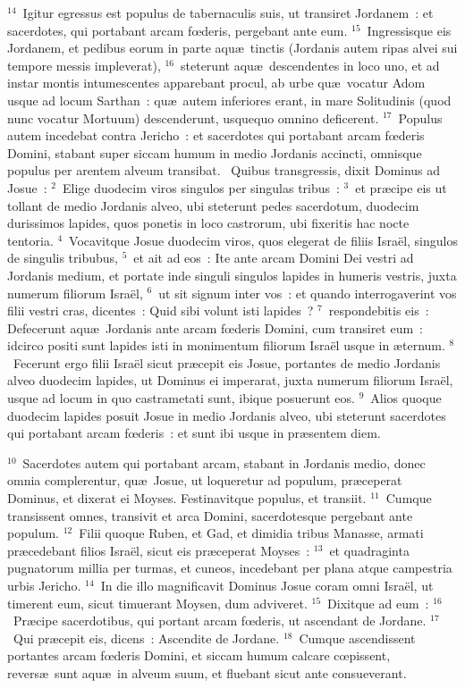 ${}^{14}$~Igitur egressus est populus de tabernaculis suis, ut transiret Jordanem~: et sacerdotes, qui portabant arcam fœderis, pergebant ante eum.
${}^{15}$~Ingressisque eis Jordanem, et pedibus eorum in parte aqu\ae\ tinctis (Jordanis autem ripas alvei sui tempore messis impleverat),
${}^{16}$~steterunt aqu\ae\ descendentes in loco uno, et ad instar montis intumescentes apparebant procul, ab urbe qu\ae\ vocatur Adom usque ad locum Sarthan~: qu\ae\ autem inferiores erant, in mare Solitudinis (quod nunc vocatur Mortuum) descenderunt, usquequo omnino deficerent.
${}^{17}$~Populus autem incedebat contra Jericho~: et sacerdotes qui portabant arcam fœderis Domini, stabant super siccam humum in medio Jordanis accincti, omnisque populus per arentem alveum transibat.
~\lettrine[lines=10,image=true,loversize=0.05,lraise=-0.03]{Q}{}uibus transgressis, dixit Dominus ad Josue~:
${}^{2}$~Elige duodecim viros singulos per singulas tribus~:
${}^{3}$~et pr\ae cipe eis ut tollant de medio Jordanis alveo, ubi steterunt pedes sacerdotum, duodecim durissimos lapides, quos ponetis in loco castrorum, ubi fixeritis hac nocte tentoria.
${}^{4}$~Vocavitque Josue duodecim viros, quos elegerat de filiis Isra\"el, singulos de singulis tribubus,
${}^{5}$~et ait ad eos~: Ite ante arcam Domini Dei vestri ad Jordanis medium, et portate inde singuli singulos lapides in humeris vestris, juxta numerum filiorum Isra\"el,
${}^{6}$~ut sit signum inter vos~: et quando interrogaverint vos filii vestri cras, dicentes~: Quid sibi volunt isti lapides~?
${}^{7}$~respondebitis eis~: Defecerunt aqu\ae\ Jordanis ante arcam fœderis Domini, cum transiret eum~: idcirco positi sunt lapides isti in monimentum filiorum Isra\"el usque in \ae ternum.
${}^{8}$~Fecerunt ergo filii Isra\"el sicut pr\ae cepit eis Josue, portantes de medio Jordanis alveo duodecim lapides, ut Dominus ei imperarat, juxta numerum filiorum Isra\"el, usque ad locum in quo castrametati sunt, ibique posuerunt eos.
${}^{9}$~Alios quoque duodecim lapides posuit Josue in medio Jordanis alveo, ubi steterunt sacerdotes qui portabant arcam fœderis~: et sunt ibi usque in pr\ae sentem diem.


${}^{10}$~Sacerdotes autem qui portabant arcam, stabant in Jordanis medio, donec omnia complerentur, qu\ae\ Josue, ut loqueretur ad populum, pr\ae ceperat Dominus, et dixerat ei Moyses. Festinavitque populus, et transiit.
${}^{11}$~Cumque transissent omnes, transivit et arca Domini, sacerdotesque pergebant ante populum.
${}^{12}$~Filii quoque Ruben, et Gad, et dimidia tribus Manasse, armati pr\ae cedebant filios Isra\"el, sicut eis pr\ae ceperat Moyses~:
${}^{13}$~et quadraginta pugnatorum millia per turmas, et cuneos, incedebant per plana atque campestria urbis Jericho.
${}^{14}$~In die illo magnificavit Dominus Josue coram omni Isra\"el, ut timerent eum, sicut timuerant Moysen, dum adviveret.
${}^{15}$~Dixitque ad eum~:
${}^{16}$~Pr\ae cipe sacerdotibus, qui portant arcam fœderis, ut ascendant de Jordane.
${}^{17}$~Qui pr\ae cepit eis, dicens~: Ascendite de Jordane.
${}^{18}$~Cumque ascendissent portantes arcam fœderis Domini, et siccam humum calcare cœpissent, revers\ae\ sunt aqu\ae\ in alveum suum, et fluebant sicut ante consueverant.


